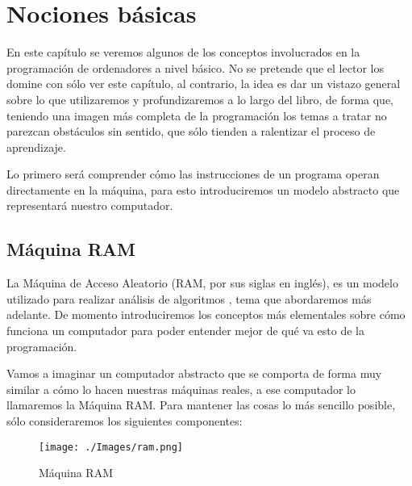 \chapter{Nociones básicas}

En este capítulo se veremos algunos de los conceptos involucrados en la programación de ordenadores a nivel básico. No se pretende que el lector los domine con sólo ver este capítulo, al contrario, la idea es dar un vistazo general sobre lo que utilizaremos y profundizaremos a lo largo del libro, de forma que, teniendo una imagen más completa de la programación los temas a tratar no parezcan obstáculos sin sentido, que sólo tienden a ralentizar el proceso de aprendizaje. 

Lo primero será comprender cómo las instrucciones de un programa operan directamente en la máquina, para esto introduciremos un modelo abstracto que representará nuestro computador.

\section{Máquina RAM}

 La Máquina de Acceso Aleatorio (RAM, por sus siglas en inglés), es un modelo utilizado para realizar análisis de algoritmos \cite[p.~31]{algDsgn}, tema que abordaremos más adelante. De momento introduciremos los conceptos más elementales sobre cómo funciona un computador para poder entender mejor de qué va esto de la programación. 
 
Vamos a imaginar un computador abstracto que se comporta de forma muy similar a cómo lo hacen nuestras máquinas reales, a ese computador lo llamaremos la Máquina RAM. Para mantener las cosas lo más sencillo posible, sólo consideraremos los siguientes componentes:


\begin{figure}[h!]
	\centering
	\texttt{[image: ./Images/ram.png]}
	\caption{Máquina RAM}
	\label{figram}
\end{figure}




